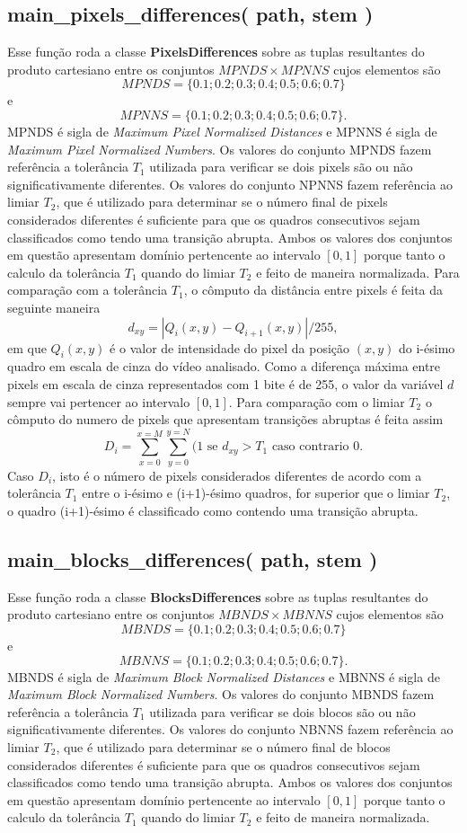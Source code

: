 \documentclass{article}
\begin{document}
%
\subsection{main\_pixels\_differences( path, stem )}
Esse função roda a classe \textbf{PixelsDifferences} sobre as tuplas resultantes do produto cartesiano entre os conjuntos $MPNDS \times MPNNS$ cujos elementos são
\[
MPNDS = \{0.1; 0.2; 0.3; 0.4; 0.5; 0.6; 0.7 \}
\]
e
\[
MPNNS = \{0.1; 0.2; 0.3; 0.4; 0.5; 0.6; 0.7 \}.
\]
MPNDS é sigla de \textit{Maximum Pixel Normalized Distances} e MPNNS é sigla de \textit{Maximum Pixel Normalized Numbers}. Os valores do conjunto MPNDS fazem referência a tolerância $T_1$ utilizada para verificar se dois pixels são ou não significativamente diferentes. Os valores do conjunto NPNNS fazem referência ao limiar $T_2$, que é utilizado para determinar se o número final de pixels considerados diferentes é suficiente para que os quadros consecutivos sejam classificados como tendo uma transição abrupta. Ambos os valores dos conjuntos em questão apresentam domínio pertencente ao intervalo $[0,1]$ porque tanto o calculo da tolerância $T_1$ quando do limiar $T_2$ e feito de maneira normalizada. Para comparação com a tolerância $T_1$, o cômputo da distância entre pixels é feita da seguinte maneira
\[
	d_{xy} = | Q_i(x,y) - Q_{i+1}(x,y) | / 255,
\]
em que $Q_i(x,y)$ é o valor de intensidade do pixel da posição $(x,y)$ do i-ésimo quadro em escala de cinza do vídeo analisado. Como a diferença máxima entre pixels em escala de cinza representados com 1 bite é de 255, o valor da variável $d$ sempre vai pertencer ao intervalo $[0,1]$. Para comparação com o limiar $T_2$ o cômputo do numero de pixels que apresentam transições abruptas é feita assim
\[
D_i = \sum_{x=0}^{x=M}\sum_{y=0}^{y=N} (1 \text{  se  } d_{xy} > T_1 \text{  caso contrario  } 0.
\]
Caso $D_i$, isto é o número de pixels considerados diferentes de acordo com a tolerância $T_1$ entre o i-ésimo e (i+1)-ésimo quadros, for superior que o limiar $T_2$, o quadro (i+1)-ésimo é classificado como contendo uma transição abrupta.


%
\subsection{main\_blocks\_differences( path, stem )}
Esse função roda a classe \textbf{BlocksDifferences} sobre as tuplas resultantes do produto cartesiano entre os conjuntos $MBNDS \times MBNNS$ cujos elementos são
\[
MBNDS = \{0.1; 0.2; 0.3; 0.4; 0.5; 0.6; 0.7 \}
\]
e
\[
MBNNS = \{0.1; 0.2; 0.3; 0.4; 0.5; 0.6; 0.7 \}.
\]
MBNDS é sigla de \textit{Maximum Block Normalized Distances} e MBNNS é sigla de \textit{Maximum Block Normalized Numbers}. Os valores do conjunto MBNDS fazem referência a tolerância $T_1$ utilizada para verificar se dois blocos são ou não significativamente diferentes. Os valores do conjunto NBNNS fazem referência ao limiar $T_2$, que é utilizado para determinar se o número final de blocos considerados diferentes é suficiente para que os quadros consecutivos sejam classificados como tendo uma transição abrupta. Ambos os valores dos conjuntos em questão apresentam domínio pertencente ao intervalo $[0,1]$ porque tanto o calculo da tolerância $T_1$ quando do limiar $T_2$ e feito de maneira normalizada. 
\end{document}
